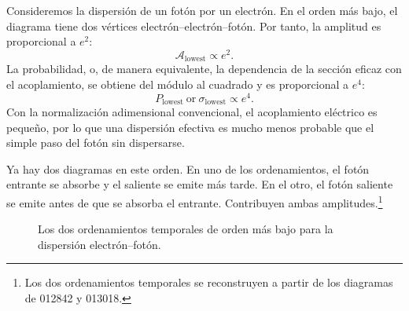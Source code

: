 \begin{classroomqa}\end{classroomqa}

Consideremos la dispersión de un fotón por un electrón. En el orden más bajo, el diagrama tiene dos vértices electrón--electrón--fotón. Por tanto, la amplitud es proporcional a \(e^2\):
\begin{equation}
\mathcal{A}_{\mathrm{lowest}}\propto e^2.
\end{equation}
La probabilidad, o, de manera equivalente, la dependencia de la sección eficaz con el acoplamiento, se obtiene del módulo al cuadrado y es proporcional a \(e^4\):
\begin{equation}
P_{\mathrm{lowest}}\ \text{or}\ \sigma_{\mathrm{lowest}}
\propto e^4.
\end{equation}
Con la normalización adimensional convencional, el acoplamiento eléctrico es pequeño, por lo que una dispersión efectiva es mucho menos probable que el simple paso del fotón sin dispersarse.

Ya hay dos diagramas en este orden. En uno de los ordenamientos, el fotón entrante se absorbe y el saliente se emite más tarde. En el otro, el fotón saliente se emite antes de que se absorba el entrante. Contribuyen ambas amplitudes.\footnote{Los dos ordenamientos temporales se reconstruyen a partir de los diagramas de 012842 y 013018.}

\begin{figure}[htbp]\centering
{}\caption{Los dos ordenamientos temporales de orden más bajo para la dispersión electrón--fotón.}\end{figure}

